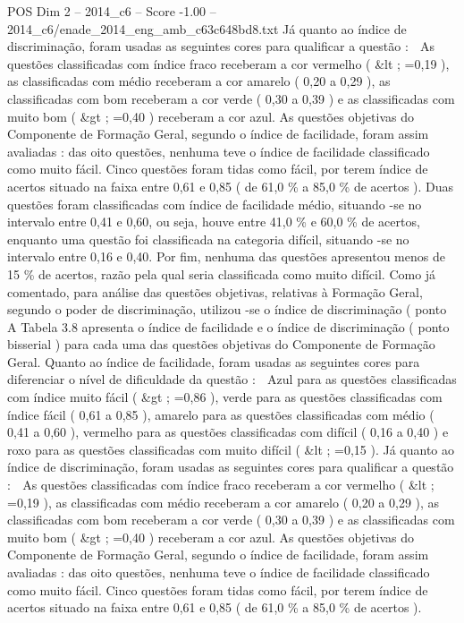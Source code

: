 \begin{textsample}{POS Dim 2 – 2014\_c6 – Score -1.00 – 2014\_c6/enade\_2014\_eng\_amb\_c63c648bd8.txt}
Já quanto ao índice de discriminação, foram usadas as seguintes cores para qualificar a questão :  As questões classificadas com índice fraco receberam a cor vermelho ( \&lt ; =0,19 ), as classificadas com médio receberam a cor amarelo ( 0,20 a 0,29 ), as classificadas com bom receberam a cor verde ( 0,30 a 0,39 ) e as classificadas com muito bom ( \&gt ; =0,40 ) receberam a cor azul.
As questões objetivas do Componente de Formação Geral, segundo o índice de facilidade, foram assim avaliadas : das oito questões, nenhuma teve o índice de facilidade classificado como muito fácil.
Cinco questões foram tidas como fácil, por terem índice de acertos situado na faixa entre 0,61 e 0,85 ( de 61,0 \% a 85,0 \% de acertos ).
Duas questões foram classificadas com índice de facilidade médio, situando -se no intervalo entre 0,41 e 0,60, ou seja, houve entre 41,0 \% e 60,0 \% de acertos, enquanto uma questão foi classificada na categoria difícil, situando -se no intervalo entre 0,16 e 0,40.
Por fim, nenhuma das questões apresentou menos de 15 \% de acertos, razão pela qual seria classificada como muito difícil.
Como já comentado, para análise das questões objetivas, relativas à Formação Geral, segundo o poder de discriminação, utilizou -se o índice de discriminação ( ponto A Tabela 3.8 apresenta o índice de facilidade e o índice de discriminação ( ponto bisserial ) para cada uma das questões objetivas do Componente de Formação Geral.
Quanto ao índice de facilidade, foram usadas as seguintes cores para diferenciar o nível de dificuldade da questão :  Azul para as questões classificadas com índice muito fácil ( \&gt ; =0,86 ), verde para as questões classificadas com índice fácil ( 0,61 a 0,85 ), amarelo para as questões classificadas com médio ( 0,41 a 0,60 ), vermelho para as questões classificadas com difícil ( 0,16 a 0,40 ) e roxo para as questões classificadas com muito difícil ( \&lt ; =0,15 ).
Já quanto ao índice de discriminação, foram usadas as seguintes cores para qualificar a questão :  As questões classificadas com índice fraco receberam a cor vermelho ( \&lt ; =0,19 ), as classificadas com médio receberam a cor amarelo ( 0,20 a 0,29 ), as classificadas com bom receberam a cor verde ( 0,30 a 0,39 ) e as classificadas com muito bom ( \&gt ; =0,40 ) receberam a cor azul.
As questões objetivas do Componente de Formação Geral, segundo o índice de facilidade, foram assim avaliadas : das oito questões, nenhuma teve o índice de facilidade classificado como muito fácil.
Cinco questões foram tidas como fácil, por terem índice de acertos situado na faixa entre 0,61 e 0,85 ( de 61,0 \% a 85,0 \% de acertos ).

\end{textsample}
